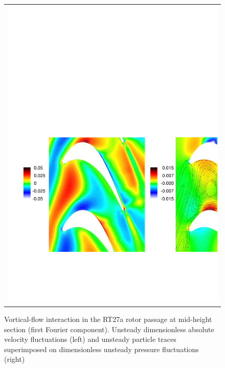 \begin{figure}
\begin{center}
\begin{tabular}{c}
{        \includegraphics[width=130mm,clip=t]{CHAP_RT27/FIGURE/unsmidsec_6.pdf}}
   \end{tabular}
  \end{center}
  \vspace{-8mm}
  \caption{Vortical-flow interaction in the RT27a rotor passage at
           mid-height section (first Fourier component).
           Unsteady dimensionless absolute velocity fluctuations (left) and
           unsteady particle traces
           superimposed on dimensionless unsteady pressure fluctuations (right)}
  \label{rt27_vortical2d_1.fig}
\end{figure}
%
